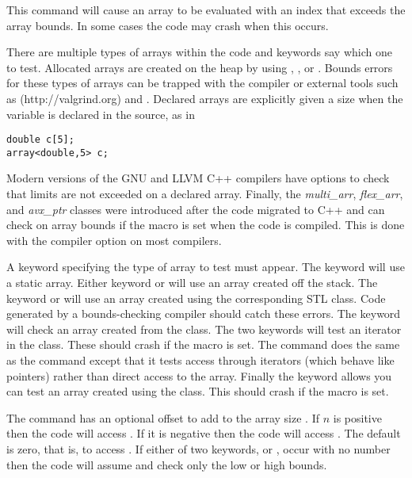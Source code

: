 This command will cause an array to be evaluated with an index that
exceeds the array bounds.  In some cases the code may crash when this occurs.

There are multiple types of arrays within the code and keywords say which
one to test.
Allocated arrays are created on the heap by using
, , or .
Bounds errors for these types of arrays can be trapped with the compiler or
external tools such as  (http://valgrind.org)
and .
Declared arrays are explicitly given a size when the variable
is declared in the source, as in
\begin{verbatim}
double c[5];
array<double,5> c;
\end{verbatim}
Modern versions of the GNU and LLVM C++ compilers have options to check that limits are not
exceeded on a declared array.
Finally, the \emph{multi\_arr}, \emph{flex\_arr}, and \emph{avx\_ptr} classes were introduced
after the code migrated to C++ and can check on array bounds if the macro
 is set when the code is compiled.
This is done with the
compiler option  on most compilers.

A keyword specifying the type of array to test must appear.
The keyword
 will use
a static array.
Either keyword  or  will use an array created
off the stack. The keyword  or  will use an array created
using the corresponding STL class.
Code generated by a bounds-checking compiler should catch these errors.
The keyword
 will
check an array created from the  class.
The two keywords
 will test an iterator in the
 class.
These should crash if
the macro  is set.
The  command does
the same as the  command
except that it tests access
through iterators (which behave like pointers) rather
than direct access to the array.
Finally the keyword  allows you can test an array created using the  class.
This should crash if
the macro  is set.

The  command has an optional offset
to add to the array size .
If $n$ is positive then the code will access
.
If it is negative then the code will access .
The default is zero,
that is, to access .
If either of two keywords,  or
, occur with no number then the code will assume  and check only the low or high bounds.

